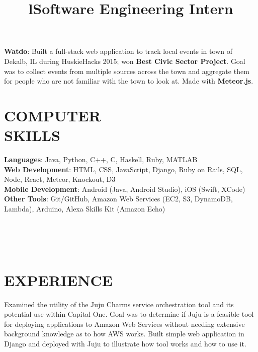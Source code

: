 \documentclass[margin]{res}
\begin{document}
\begin{resume}
\par
\textbf{Watdo}:
Built a full-stack web application to track local events in town of Dekalb, IL during
HuskieHacks 2015; won \textbf{Best Civic Sector Project}. Goal was to collect events
from multiple sources across the town and aggregate them for people who are not familiar
with the town to look at. Made with \textbf{Meteor.js}.


\section{COMPUTER\\SKILLS}

\textbf{Languages}: Java, Python, C++, C, Haskell, Ruby, MATLAB
\\
\textbf{Web Development}: HTML, CSS, JavaScript, Django, Ruby on Rails, SQL, Node,
                          React, Meteor, Knockout, D3
\\
\textbf{Mobile Development}: Android (Java, Android Studio),
iOS (Swift, XCode)
\\
\textbf{Other Tools}: Git/GitHub, Amazon Web Services (EC2, S3, DynamoDB, Lambda),
Arduino, Alexa Skills Kit (Amazon Echo)

\begin{format}
\title{l}\\
\\
\body\\
\end{format}

\section{EXPERIENCE}
\title{\textbf{Software Engineering Intern}}
\begin{position}
Examined the utility of the Juju Charms service orchestration tool and its potential
use within Capital One. Goal was to determine if Juju is a feasible tool for deploying
applications to Amazon Web Services without needing extensive background knowledge as
to how AWS works. Built simple web application in Django and deployed with Juju to
illustrate how tool works and how to use it.
\end{position}


\end{resume}
\end{document}
